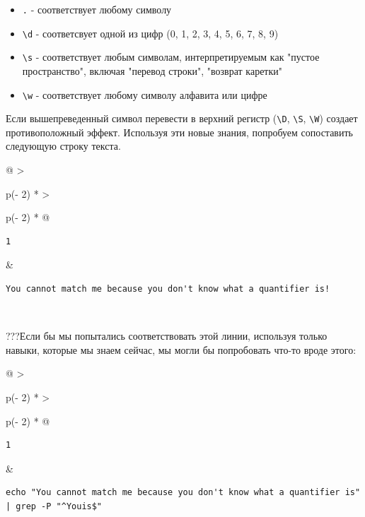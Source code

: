 \documentclass{article}
\begin{document}
\begin{itemize}
\tightlist
\item
  \texttt{.} - соответствует любому символу
\item
  \texttt{\textbackslash{}d} - соответсвует одной из цифр (0, 1, 2, 3,
  4, 5, 6, 7, 8, 9)
\item
  \texttt{\textbackslash{}s} - соответствует любым символам,
  интерпретируемым как "пустое пространство", включая "перевод строки",
  "возврат каретки"
\item
  \texttt{\textbackslash{}w} - соответствует любому символу алфавита или
  цифре
\end{itemize}

Если вышепреведенный символ перевести в верхний регистр
(\texttt{\textbackslash{}D}, \texttt{\textbackslash{}S},
\texttt{\textbackslash{}W}) создает противоположный эффект. Используя
эти новые знания, попробуем сопоставить следующую строку текста.

\begin{longtable}[]{@{}
  >{\raggedright\arraybackslash}p{(\columnwidth - 2\tabcolsep) * }
  >{\raggedright\arraybackslash}p{(\columnwidth - 2\tabcolsep) * }@{}}
\toprule
\endhead
\begin{minipage}[t]{\linewidth}\raggedright
\begin{verbatim}
1
\end{verbatim}
\end{minipage} & \begin{minipage}[t]{\linewidth}\raggedright
\begin{verbatim}
You cannot match me because you don't know what a quantifier is!
\end{verbatim}
\end{minipage} \\ \addlinespace
\bottomrule
\end{longtable}

???Если бы мы попытались соответствовать этой линии, используя только
навыки, которые мы знаем сейчас, мы могли бы попробовать что-то вроде
этого:

\begin{longtable}[]{@{}
  >{\raggedright\arraybackslash}p{(\columnwidth - 2\tabcolsep) * }
  >{\raggedright\arraybackslash}p{(\columnwidth - 2\tabcolsep) * }@{}}
\toprule
\endhead
\begin{minipage}[t]{\linewidth}\raggedright
\begin{verbatim}
1
\end{verbatim}
\end{minipage} & \begin{minipage}[t]{\linewidth}\raggedright
\begin{verbatim}
echo "You cannot match me because you don't know what a quantifier is" | grep -P "^Youis$"
\end{verbatim}
\end{minipage} \\ \addlinespace
\bottomrule
\end{longtable}
\end{document}
